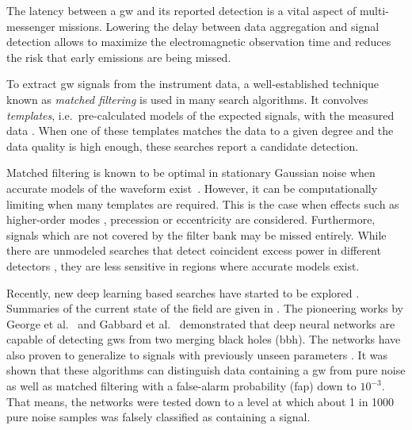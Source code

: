 The latency between a \acrshort{gw} and its reported detection is a vital aspect of multi-messenger missions. Lowering the delay between data aggregation and signal detection allows to maximize the electromagnetic observation time and reduces the risk that early emissions are being missed.

To extract \acrshort{gw} signals from the instrument data, a well-established technique known as \textit{matched filtering} is used in many search algorithms. It convolves \textit{templates}, i.e.\ pre-calculated models of the expected signals, with the measured data \cite{ligo_pipelines, Sachdev:2019vvd, Adams:2015ulm, Nitz:2018rgo, Hooper:2011rb}. When one of these templates matches the data to a given degree and the data quality is high enough, these searches report a candidate detection. 

Matched filtering is known to be optimal in stationary Gaussian noise when accurate models of the waveform exist~\cite{Allen:2005fk}. However, it can be computationally limiting when many templates are required. This is the case when effects such as higher-order modes \cite{Harry:2017weg}, precession \cite{Harry:2016ijz} or eccentricity \cite{Nitz:2019spj} are considered. Furthermore, signals which are not covered by the filter bank may be missed entirely. While there are unmodeled searches that detect coincident excess power in different detectors \cite{Klimenko:2005xv, Klimenko:2015ypf, Lynch:2015yin}, they are less sensitive in regions where accurate models exist.

Recently, new deep learning based searches have started to be explored \cite{George:2016hay, George:2017pmj, Gabbard:2017lja, Dreissigacker:2019edy, Krastev:2019koe, Schafer:2020kor}. Summaries of the current state of the field are given in \cite{Cuoco:2020ogp, Huerta:2021ybd}. The pioneering works by George et al.\ \cite{George:2016hay} and Gabbard et al.\ \cite{Gabbard:2017lja} demonstrated that deep neural networks are capable of detecting \acrshort{gw}s from two merging black holes (\acrshort{bbh}). The networks have also proven to generalize to signals with previously unseen parameters \cite{George:2016hay, Xia:2020vem}. It was shown that these algorithms can distinguish data containing a \acrshort{gw} from pure noise as well as matched filtering with a false-alarm probability (\acrshort{fap}) down to $10^{-3}$. That means, the networks were tested down to a level at which about 1 in 1000 pure noise samples was falsely classified as containing a signal.

